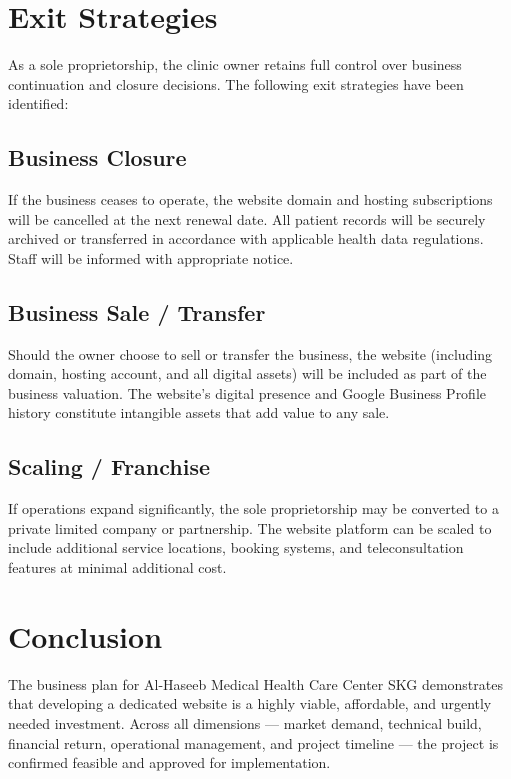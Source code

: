 \documentclass[12pt, a4paper]{article}
\begin{document}
\section{Exit Strategies}

As a sole proprietorship, the clinic owner retains full control over business continuation and closure decisions. The following exit strategies have been identified:

\subsection{Business Closure}
If the business ceases to operate, the website domain and hosting subscriptions will be cancelled at the next renewal date. All patient records will be securely archived or transferred in accordance with applicable health data regulations. Staff will be informed with appropriate notice.

\subsection{Business Sale / Transfer}
Should the owner choose to sell or transfer the business, the website (including domain, hosting account, and all digital assets) will be included as part of the business valuation. The website's digital presence and Google Business Profile history constitute intangible assets that add value to any sale.

\subsection{Scaling / Franchise}
If operations expand significantly, the sole proprietorship may be converted to a private limited company or partnership. The website platform can be scaled to include additional service locations, booking systems, and teleconsultation features at minimal additional cost.

\newpage

\section*{Conclusion}

The business plan for Al-Haseeb Medical Health Care Center SKG demonstrates that developing a dedicated website is a highly viable, affordable, and urgently needed investment. Across all dimensions — market demand, technical build, financial return, operational management, and project timeline — the project is confirmed feasible and approved for implementation.
\end{document}
